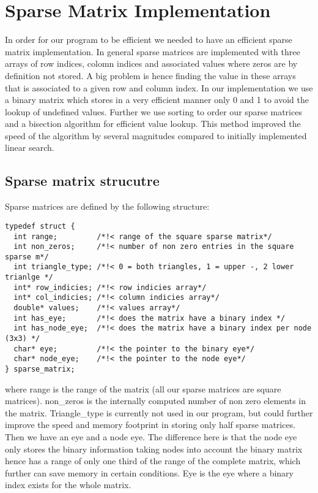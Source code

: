 \section{Sparse Matrix Implementation}

In order for our program to be efficient we needed to have an
efficient sparse matrix implementation. In general sparse matrices
are implemented with three arrays of row indices, colomn indices and
associated values where zeros are by definition not stored. A big
problem is hence finding the value in these arrays that is associated
to a given row and column index. In our implementation we use a binary
matrix which stores in a very efficient manner only 0 and 1 to avoid
the lookup of undefined values. Further we use sorting to order our
sparse matrices and a bisection algorithm for efficient value lookup. This
method improved the speed of the algorithm by several magnitudes
compared to initially implemented linear search.

\subsection{Sparse matrix strucutre}

Sparse matrices are defined by the following structure:
\begin{lstlisting}
typedef struct {
  int range;         /*!< range of the square sparse matrix*/
  int non_zeros;     /*!< number of non zero entries in the square sparse m*/
  int triangle_type; /*!< 0 = both triangles, 1 = upper -, 2 lower trianlge */
  int* row_indicies; /*!< row indicies array*/
  int* col_indicies; /*!< column indicies array*/
  double* values;    /*!< values array*/
  int has_eye;       /*!< does the matrix have a binary index */
  int has_node_eye;  /*!< does the matrix have a binary index per node (3x3) */
  char* eye;         /*!< the pointer to the binary eye*/
  char* node_eye;    /*!< the pointer to the node eye*/
} sparse_matrix;
\end{lstlisting}
where range is the range of the matrix (all our sparse matrices are
square matrices). non\_zeros is the internally computed number of non
zero elements in the matrix. Triangle\_type is currently not used
in our program, but could further improve the speed and memory
footprint in storing only half sparse matrices. Then we have an eye
and a node eye. The difference here is that the node eye only stores
the binary information taking nodes into account the binary matrix
hence has a range of only one third of the range of the complete
matrix, which further can save memory in certain conditions. Eye is
the eye where a binary index exists for the whole matrix.


